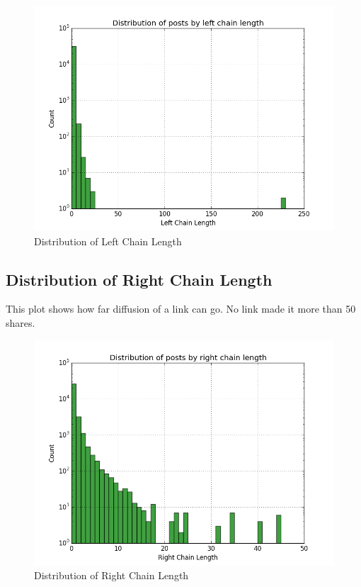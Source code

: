 \documentclass{article} %
\begin{document}
\begin{figure}[h]
\begin{center}
\includegraphics[width=5in]{left_chain.png}
\caption{Distribution of Left Chain Length}
\end{center}
\end{figure}

\subsection{Distribution of Right Chain Length}

This plot shows how far diffusion of a link can go. No link made it more than 50 shares. 

\begin{figure}[h]
\begin{center}
\includegraphics[width=5in]{right_chain.png}
\caption{Distribution of Right Chain Length}
\end{center}
\end{figure}
\end{document}
